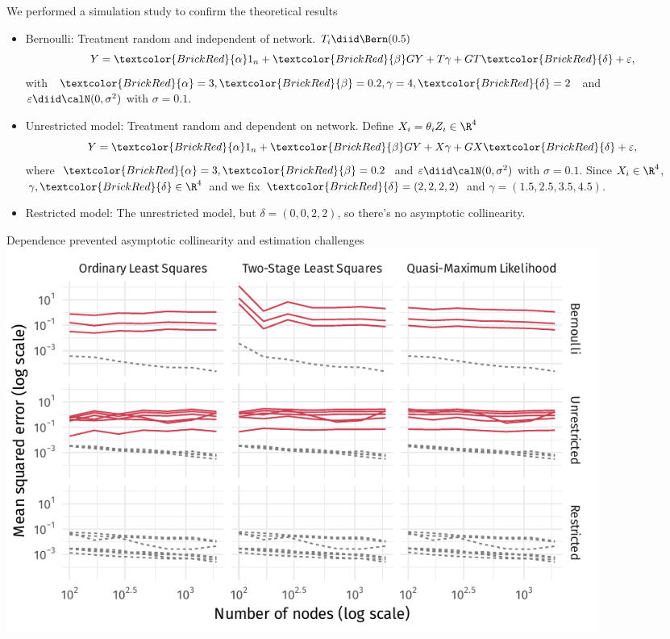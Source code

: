 \documentclass[aspectratio=169]{beamer}
\theoremstyle{remark}
\begin{document}
\begin{frame}{We performed a simulation study to confirm the theoretical results}
    \begin{itemize}
        \setlength\itemsep{1.75em}
        \item \textcolor{BrickRed}{Bernoulli}: Treatment random and independent of network. $T_i \diid \Bern(0.5)$
              \begin{equation*}
                  Y = \textcolor{BrickRed}{\alpha} 1_n + \textcolor{BrickRed}{\beta} G Y + T \gamma + G T \textcolor{BrickRed}{\delta} + \varepsilon,
              \end{equation*}
              with $\textcolor{BrickRed}{\alpha} = 3, \textcolor{BrickRed}{\beta} = 0.2, \gamma = 4, \textcolor{BrickRed}{\delta} = 2$ and $\varepsilon \diid \calN(0, \sigma^2)$ with $\sigma = 0.1$.
        \item \textcolor{BrickRed}{Unrestricted model}: Treatment random and dependent on network. Define $X_i = \theta_i Z_i \in \R^4$
              \begin{equation*}
                  Y = \textcolor{BrickRed}{\alpha} 1_n + \textcolor{BrickRed}{\beta} G Y + X \gamma + G X \textcolor{BrickRed}{\delta} + \varepsilon,
              \end{equation*}
              where $\textcolor{BrickRed}{\alpha} = 3, \textcolor{BrickRed}{\beta} = 0.2$ and $\varepsilon \diid \calN(0, \sigma^2)$ with $\sigma = 0.1$. Since $X_i \in \R^4$, $\gamma, \textcolor{BrickRed}{\delta} \in \R^4$ and we fix $\textcolor{BrickRed}{\delta} = (2, 2, 2, 2)$ and $\gamma = (1.5, 2.5, 3.5, 4.5)$.
        \item Restricted model: The unrestricted model, but $\delta = (0, 0, 2, 2)$, so there's no asymptotic collinearity.
    \end{itemize}
\end{frame}

\begin{frame}{Dependence prevented \textcolor{BrickRed}{asymptotic collinearity} and estimation challenges}
    \centering
    \includegraphics[width=0.85\textwidth]{./figures/simulations/jobtalk-mse-all.pdf}
\end{frame}
\end{document}

